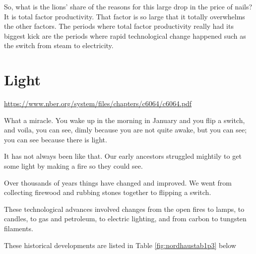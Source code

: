 \documentclass[
]{book}
\begin{document}
So, what is the lions' share of the reasons for this large drop in the price of nails? It is total factor productivity. That factor is so large that it totally overwhelms the other factors. The periods where total factor productivity really had its biggest kick are the periods where rapid technological change happened such as the switch from steam to electricity.

\hypertarget{light}{%
\section{Light}\label{light}}

\url{https://www.nber.org/system/files/chapters/c6064/c6064.pdf}

What a miracle. You wake up in the morning in January and you flip a switch, and voila, you can see, dimly because you are not quite awake, but you can see; you can see because there is light.

It has not always been like that. Our early ancestors struggled mightily to get some light by making a fire so they could see.

Over thousands of years things have changed and improved. We went from collecting firewood and rubbing stones together to flipping a switch.

These technological advances involved changes from the open fires to lamps, to candles, to gas and petroleum, to electric lighting, and from carbon to tungsten filaments.

These historical developments are listed in Table \ref{fig:nordhaustab1p3} below
\end{document}
